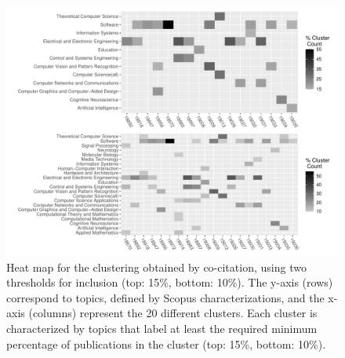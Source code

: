 \begin{figure}[ht]
\centering
\includegraphics[scale=0.6]{scopus_dblp_heatmap3.pdf}
\caption{Heat map for the clustering obtained by co-citation, using two thresholds for inclusion (top: 15\%, bottom: 10\%). The  y-axis (rows) correspond to topics, defined by Scopus characterizations, and the
x-axis (columns) represent the 20 different clusters.  
Each cluster is characterized by topics that label at least the required minimum percentage of publications in the cluster (top: 15\%, bottom: 10\%).   }
\label{fig:heatmap_cocit}       %
\end{figure}
\newpage

